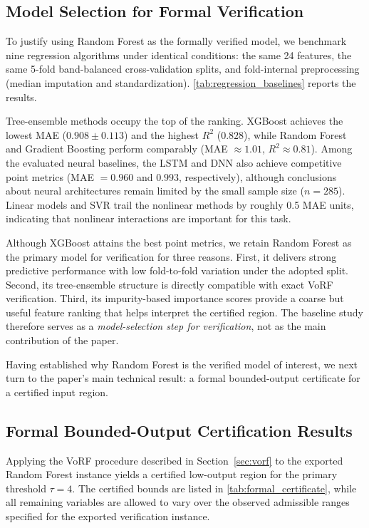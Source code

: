 \documentclass[review]{vgtc}              %
\begin{document}
\subsection{Model Selection for Formal Verification}\label{sec:baselines}

To justify using Random Forest as the formally verified model, we benchmark nine regression algorithms under identical conditions: the same 24 features, the same 5-fold band-balanced cross-validation splits, and fold-internal preprocessing (median imputation and standardization). \cref{tab:regression_baselines} reports the results.



Tree-ensemble methods occupy the top of the ranking. XGBoost achieves the lowest MAE ($0.908 \pm 0.113$) and the highest $R^2$ ($0.828$), while Random Forest and Gradient Boosting perform comparably (MAE $\approx 1.01$, $R^2 \approx 0.81$). Among the evaluated neural baselines, the LSTM and DNN also achieve competitive point metrics (MAE $= 0.960$ and $0.993$, respectively), although conclusions about neural architectures remain limited by the small sample size ($n = 285$). Linear models and SVR trail the nonlinear methods by roughly 0.5 MAE units, indicating that nonlinear interactions are important for this task.

Although XGBoost attains the best point metrics, we retain Random Forest as the primary model for verification for three reasons. First, it delivers strong predictive performance with low fold-to-fold variation under the adopted split. Second, its tree-ensemble structure is directly compatible with exact VoRF verification. Third, its impurity-based importance scores provide a coarse but useful feature ranking that helps interpret the certified region. The baseline study therefore serves as a \emph{model-selection step for verification}, not as the main contribution of the paper.

Having established why Random Forest is the verified model of interest, we next turn to the paper's main technical result: a formal bounded-output certificate for a certified input region.

\subsection{Formal Bounded-Output Certification Results}
\label{sec:formal_results}

Applying the VoRF procedure described in Section~\ref{sec:vorf} to the exported Random Forest instance yields a certified low-output region for the primary threshold $\tau = 4$. The certified bounds are listed in \cref{tab:formal_certificate}, while all remaining variables are allowed to vary over the observed admissible ranges specified for the exported verification instance.
\end{document}
